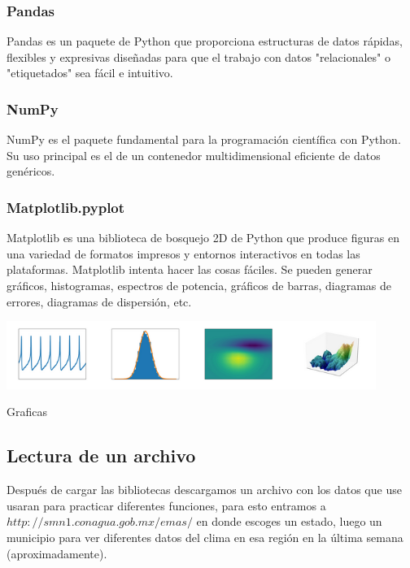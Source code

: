 \documentclass{article}
\begin{document}
\subsubsection{Pandas}

Pandas es un paquete de Python que proporciona estructuras de datos rápidas, flexibles y expresivas diseñadas para que el trabajo con datos "relacionales" o "etiquetados" sea fácil e intuitivo.

\subsubsection{NumPy}

NumPy es el paquete fundamental para la programación científica con Python. Su uso principal es el de un contenedor multidimensional eficiente de datos genéricos.

\subsubsection{Matplotlib.pyplot}

Matplotlib es una biblioteca de bosquejo 2D de Python que produce figuras en una variedad de formatos impresos y entornos interactivos en todas las plataformas.
Matplotlib intenta hacer las cosas fáciles. Se pueden generar gráficos, histogramas, espectros de potencia, gráficos de barras, diagramas de errores, diagramas de dispersión, etc.

\begin{center}
	\includegraphics[width=12cm]{Act2Matplotlib.png}
    
    Graficas
\end{center}
\vspace{0.3cm}

\subsection{Lectura de un archivo}

Después de cargar las bibliotecas descargamos un archivo con los datos que use usaran para practicar diferentes funciones, para esto entramos a $http://smn1.conagua.gob.mx/emas/$ en donde escoges un estado, luego un municipio para ver diferentes datos del clima en esa región en la última semana (aproximadamente).
\end{document}
